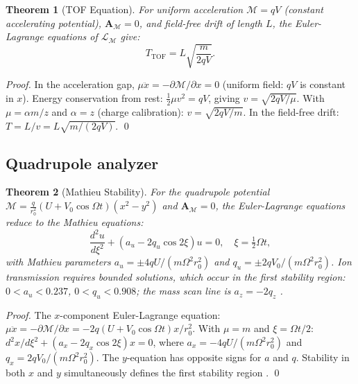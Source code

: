 \documentclass[twocolumn,10pt,a4paper]{article}
\theoremstyle{thmstyle}
\newtheorem{theorem}{Theorem}[section]
\theoremstyle{definition}
\theoremstyle{remark}
\newcommand{\LM}{\mathcal{L}_{\mathcal{M}}}
\newcommand{\AM}{\mathbf{A}_{\mathcal{M}}}
\newcommand{\Mop}{\mathcal{M}}
\begin{document}
\begin{theorem}[TOF Equation]
\label{thm:tof}
For uniform acceleration $\Mop = qV$ (constant accelerating potential),
$\AM = 0$, and field-free drift of length $L$, the Euler-Lagrange
equations of $\LM$ give:
\begin{equation}
T_{\mathrm{TOF}} = L\sqrt{\frac{m}{2qV}}.
\label{eq:tof}
\end{equation}
\end{theorem}

\begin{proof}
In the acceleration gap, $\mu\ddot{x} = -\partial\Mop/\partial x = 0$
(uniform field: $qV$ is constant in $x$). Energy conservation from
rest: $\tfrac{1}{2}\mu v^2 = qV$, giving $v = \sqrt{2qV/\mu}$.
With $\mu = \alpha m/z$ and $\alpha = z$ (charge calibration):
$v = \sqrt{2qV/m}$.
In the field-free drift: $T = L/v = L\sqrt{m/(2qV)}$. \qed
\end{proof}

\subsection{Quadrupole analyzer}

\begin{theorem}[Mathieu Stability]
\label{thm:mathieu}
For the quadrupole potential
$\Mop = \tfrac{q}{r_0^2}(U + V_0\cos\Omega t)(x^2 - y^2)$
and $\AM = 0$, the Euler-Lagrange equations reduce to the
Mathieu equations:
\begin{equation}
\frac{d^2u}{d\xi^2} + (a_u - 2q_u\cos 2\xi)u = 0,\quad
\xi = \tfrac{1}{2}\Omega t,
\label{eq:mathieu}
\end{equation}
with Mathieu parameters $a_u = \pm 4qU/(m\Omega^2 r_0^2)$ and
$q_u = \pm 2qV_0/(m\Omega^2 r_0^2)$. Ion transmission requires
bounded solutions, which occur in the first stability region:
$0 < a_u < 0.237$, $0 < q_u < 0.908$; the mass scan line is
$a_z = -2q_z$ \citep{march1989}.
\end{theorem}

\begin{proof}
The $x$-component Euler-Lagrange equation:
$\mu\ddot{x} = -\partial\Mop/\partial x = -2q(U+V_0\cos\Omega t)x/r_0^2$.
With $\mu = m$ and $\xi = \Omega t/2$:
$d^2x/d\xi^2 + (a_x - 2q_x\cos 2\xi)x = 0$,
where $a_x = -4qU/(m\Omega^2 r_0^2)$ and $q_x = 2qV_0/(m\Omega^2 r_0^2)$.
The $y$-equation has opposite signs for $a$ and $q$. Stability in both
$x$ and $y$ simultaneously defines the first stability region \citep{mathieu1868,march1989}.
\qed
\end{proof}
\end{document}
